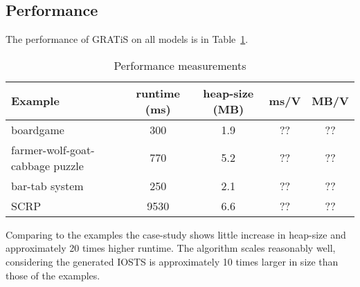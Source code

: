\subsection{Performance}
The performance of GRATiS on all models is in Table~\ref{tab:performance}.

\begin{table}[ht]
\begin{center}
\begin{tabular}{|l|c|c|c|c|}
\hline
\textbf{Example} & \textbf{runtime (ms)} & \textbf{heap-size (MB)} & \textbf{ms/V} & \textbf{MB/V} \\ \hline
boardgame & 300 & 1.9 & ?? & ?? \\ \hline
farmer-wolf-goat-cabbage puzzle & 770 & 5.2 & ?? & ?? \\ \hline
bar-tab system & 250 & 2.1 & ?? & ??\\ \hline
SCRP & 9530 & 6.6 & ?? & ?? \\ \hline
\end{tabular}
\end{center}
\caption{Performance measurements}
\label{tab:performance}
\end{table}

Comparing to the examples the case-study shows little increase in heap-size and approximately 20 times higher runtime. The algorithm scales reasonably well, considering the generated IOSTS is approximately 10 times larger in size than those of the examples.